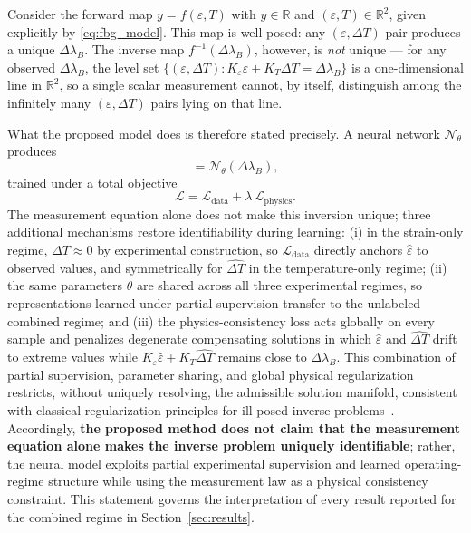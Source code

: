 \documentclass[journal,twoside,web]{ieeecolor}
\begin{document}
Consider the forward map $y = f(\varepsilon, T)$ with $y \in \mathbb{R}$ and
$(\varepsilon, T) \in \mathbb{R}^2$, given explicitly by
\eqref{eq:fbg_model}. This map is well-posed: any $(\varepsilon,\Delta T)$
pair produces a unique $\Delta\lambda_B$. The inverse map
$f^{-1}(\Delta\lambda_B)$, however, is \emph{not} unique --- for any
observed $\Delta\lambda_B$, the level set
$\{(\varepsilon,\Delta T): K_\varepsilon\varepsilon + K_T\Delta T =
\Delta\lambda_B\}$ is a one-dimensional line in $\mathbb{R}^2$, so a single
scalar measurement cannot, by itself, distinguish among the infinitely many
$(\varepsilon,\Delta T)$ pairs lying on that line.

What the proposed model does is therefore stated precisely. A neural network
$\mathcal{N}_\theta$ produces
\begin{equation}
[\hat{\varepsilon}, \widehat{\Delta T}] = \mathcal{N}_\theta(\Delta\lambda_B),
\label{eq:network_map}
\end{equation}
trained under a total objective
\begin{equation}
\mathcal{L} = \mathcal{L}_{\text{data}} + \lambda\,\mathcal{L}_{\text{physics}}.
\label{eq:total_loss_intro}
\end{equation}
The measurement equation alone does not make this inversion unique; three
additional mechanisms restore identifiability during learning: (i) in the
strain-only regime, $\Delta T \approx 0$ by experimental construction, so
$\mathcal{L}_{\text{data}}$ directly anchors $\hat{\varepsilon}$ to observed
values, and symmetrically for $\widehat{\Delta T}$ in the temperature-only
regime; (ii) the same parameters $\theta$ are shared across all three
experimental regimes, so representations learned under partial supervision
transfer to the unlabeled combined regime; and (iii) the
physics-consistency loss acts globally on every sample and penalizes
degenerate compensating solutions in which $\hat{\varepsilon}$ and
$\widehat{\Delta T}$ drift to extreme values while
$K_\varepsilon\hat{\varepsilon} + K_T\widehat{\Delta T}$ remains close to
$\Delta\lambda_B$. This combination of partial supervision, parameter
sharing, and global physical regularization restricts, without uniquely
resolving, the admissible solution manifold, consistent with classical
regularization principles for ill-posed inverse problems~\cite{b33}.
Accordingly, \textbf{the proposed method does not claim that the measurement
equation alone makes the inverse problem uniquely identifiable}; rather, the
neural model exploits partial experimental supervision and learned
operating-regime structure while using the measurement law as a physical
consistency constraint. This statement governs the interpretation of every
result reported for the combined regime in Section~\ref{sec:results}.
\end{document}
